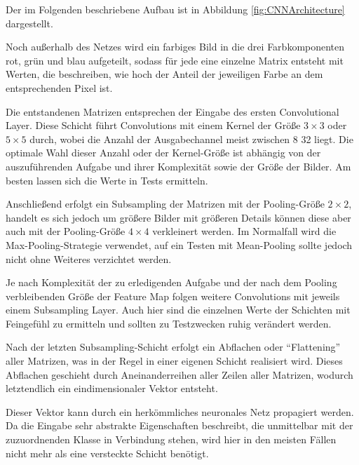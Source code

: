 \documentclass[12pt,a4]{article}
\begin{document}
Der im Folgenden beschriebene Aufbau ist in Abbildung \ref{fig:CNNArchitecture} dargestellt.

Noch außerhalb des Netzes wird ein farbiges Bild in die drei Farbkomponenten rot, grün und blau aufgeteilt, sodass für jede eine einzelne Matrix entsteht mit Werten, die beschreiben, wie hoch der Anteil der jeweiligen Farbe an dem entsprechenden Pixel ist.

Die entstandenen Matrizen entsprechen der Eingabe des ersten Convolutional Layer. Diese Schicht führt Convolutions mit einem Kernel der Größe $3 \times 3$ oder $5 \times 5$ durch, wobei die Anzahl der Ausgabechannel meist zwischen 8 32 liegt. Die optimale Wahl dieser Anzahl oder der Kernel-Größe ist abhängig von der auszuführenden Aufgabe und ihrer Komplexität sowie der Größe der Bilder. Am besten lassen sich die Werte in Tests ermitteln.

Anschließend erfolgt ein Subsampling der Matrizen mit der Pooling-Größe $2 \times 2$, handelt es sich jedoch um größere Bilder mit größeren Details können diese aber auch mit der Pooling-Größe $4 \times 4$ verkleinert werden. Im Normalfall wird die Max-Pooling-Strategie verwendet, auf ein Testen mit Mean-Pooling sollte jedoch nicht ohne Weiteres verzichtet werden.

Je nach Komplexität der zu erledigenden Aufgabe und der nach dem Pooling verbleibenden Größe der Feature Map folgen weitere Convolutions mit jeweils einem Subsampling Layer. Auch hier sind die einzelnen Werte der Schichten mit Feingefühl zu ermitteln und sollten zu Testzwecken ruhig verändert werden.

Nach der letzten Subsampling-Schicht erfolgt ein Abflachen oder \enquote{Flattening} aller Matrizen, was in der Regel in einer eigenen Schicht realisiert wird. Dieses Abflachen geschieht durch Aneinanderreihen aller Zeilen aller Matrizen, wodurch letztendlich ein eindimensionaler Vektor entsteht.

Dieser Vektor kann durch ein herkömmliches neuronales Netz propagiert werden. Da die Eingabe sehr abstrakte Eigenschaften beschreibt, die unmittelbar mit der zuzuordnenden Klasse in Verbindung stehen, wird hier in den meisten Fällen nicht mehr als eine versteckte Schicht benötigt.



\end{document}
